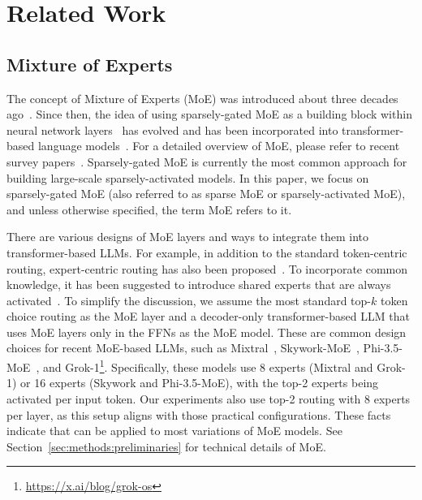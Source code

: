 \section{Related Work}



\subsection{Mixture of Experts}
\label{sec:related_works:moe}

%
%
The concept of Mixture of Experts (MoE) was introduced about three decades ago~\citep{classic_moe_1,classic_moe_2}. Since then, the idea of using sparsely-gated MoE as a building block within neural network layers~\citep{moe_layer_iclr14,shazeer2017} has evolved and has been incorporated into transformer-based language models~\citep{lepikhin2021gshard, Fedus2021SwitchTS}. For a detailed overview of MoE, please refer to recent survey papers~\citep{moe_survey}.
Sparsely-gated MoE is currently the most common approach for building large-scale sparsely-activated models.
In this paper, we focus on sparsely-gated MoE (also referred to as sparse MoE or sparsely-activated MoE), and unless otherwise specified, the term MoE refers to it.




There are various designs of MoE layers and ways to integrate them into transformer-based LLMs. For example, in addition to the standard token-centric routing, expert-centric routing has also been proposed~\citep{expert_routing}. To incorporate common knowledge, it has been suggested to introduce shared experts that are always activated~\citep{dai-etal-2024-deepseekmoe}. To simplify the discussion, %
we assume the most standard top-$k$ token choice routing as the MoE layer and a decoder-only transformer-based LLM that uses MoE layers only in the FFNs as the MoE model. 
These are common design choices for recent MoE-based LLMs, such as Mixtral~\citep{jiang2024mixtralexperts}, Skywork-MoE~\citep{wei2024skyworkmoedeepdivetraining}, Phi-3.5-MoE~\citep{abdin2024phi3technicalreporthighly}, and Grok-1\footnote{\url{https://x.ai/blog/grok-os}}. 
%
Specifically, these models use 8 experts (Mixtral and Grok-1) or 16 experts (Skywork and Phi-3.5-MoE), with the top-2 experts being activated per input token. Our experiments also use top-2 routing with 8 experts per layer, as this setup aligns with those practical configurations.
These facts indicate that \methodname{} can be applied to most variations of MoE models.
%
See Section~\ref{sec:methods:preliminaries} for technical details of MoE.





